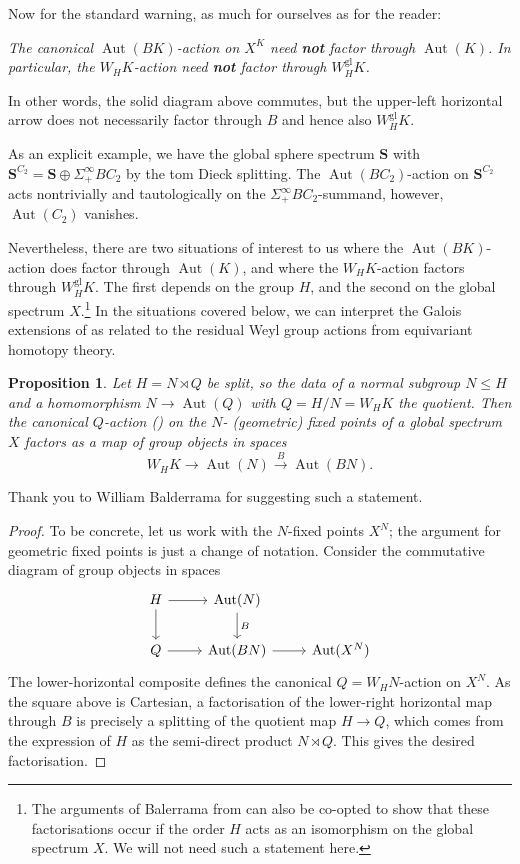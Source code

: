 \documentclass[11pt, a4paper]{article}
\newcommand{\gl}{\mathrm{gl}}
\newcommand{\1}{\mathbf{1}}
\newcommand{\Sph}{\mathbf{S}}
\DeclareMathOperator{\Aut}{Aut}
\theoremstyle{plain}
\newtheorem{prop}[equation]{Proposition}
\theoremstyle{definition}
\theoremstyle{remark}\numberwithin{equation}{section}
\begin{document}
Now for the standard warning, as much for ourselves as for the reader:

\begin{center}
    \emph{The canonical $\Aut(BK)$-action on $X^K$ need \textbf{not} factor through $\Aut(K)$. In particular, the $W_H K$-action need \textbf{not} factor through $W_H^\gl K$.}
\end{center}

In other words, the solid diagram above commutes, but the upper-left horizontal arrow does not necessarily factor through $B$ and hence also $W_H^\gl K$.

As an explicit example, we have the global sphere spectrum $\Sph$ with $\Sph^{C_2} = \Sph \oplus \Sigma^\infty_+ BC_2$ by the tom Dieck splitting. The $\Aut(BC_2)$-action on $\Sph^{C_2}$ acts nontrivially and tautologically on the $\Sigma^\infty_+ BC_2$-summand, however, $\Aut(C_2)$ vanishes.

Nevertheless, there are two situations of interest to us where the $\Aut(BK)$-action does factor through $\Aut(K)$, and where the $W_H K$-action factors through $W_H^\gl K$. The first depends on the group $H$, and the second on the global spectrum $X$.\footnote{The arguments of Balerrama from \cite[\textsection A.3]{balderrama_totalpoweroperations} can also be co-opted to show that these factorisations occur if the order $H$ acts as an isomorphism on the global spectrum $X$. We will not need such a statement here.} In the situations covered below, we can interpret the Galois extensions of  as related to the residual Weyl group actions from equivariant homotopy theory.

\begin{prop}\label{pr:no_action_conflicts_part1}
    Let $H = N\rtimes Q$ be split, so the data of a normal subgroup $N \leq H$ and a homomorphism $N \to \Aut(Q)$ with $Q=H/N = W_H K$ the quotient. Then the canonical $Q$-action () on the $N$- (geometric) fixed points of a global spectrum $X$ factors as a map of group objects in spaces
    \[W_H K \to \Aut(N) \xrightarrow{B} \Aut(BN).\]
\end{prop}

Thank you to William Balderrama for suggesting such a statement.

\begin{proof}
    To be concrete, let us work with the $N$-fixed points $X^N$; the argument for geometric fixed points is just a change of notation. Consider the commutative diagram of group objects in spaces
    \[\begin{tikzcd}
        {H}\ar[r]\ar[d] &   {\Aut(N)}\ar[d, "B"]    &   \\
        {Q}\ar[r]       &   {\Aut(BN)}\ar[r]    &   {\Aut(X^N)}
    \end{tikzcd}\]
    The lower-horizontal composite defines the canonical $Q = W_H N$-action on $X^N$. As the square above is Cartesian, a factorisation of the lower-right horizontal map through $B$ is precisely a splitting of the quotient map $H \to Q$, which comes from the expression of $H$ as the semi-direct product $N\rtimes Q$. This gives the desired factorisation.
\end{proof}
\end{document}
